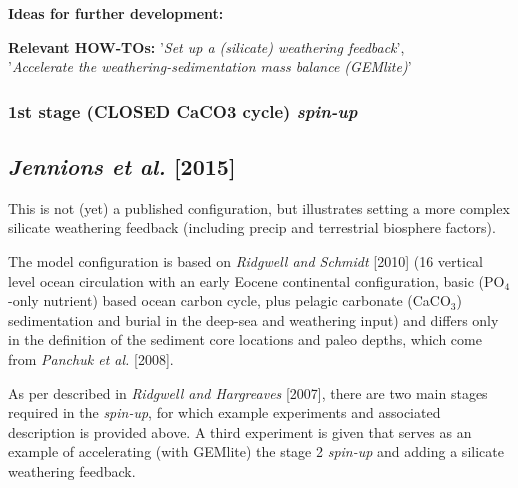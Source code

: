 \documentclass[10pt,twoside]{article}
\begin{document}
\noindent \textbf{Ideas for further development:} 

\noindent \textbf{Relevant HOW-TOs:} '\textit{Set up a (silicate) weathering feedback}',
\\'\textit{Accelerate the weathering-sedimentation mass balance (GEMlite)}'


\subsubsection{1st stage (CLOSED CaCO3 cycle) \textit{spin-up}}\label{EXAMPLE.p0055c.Jennionsetal2015.SPIN1}

\subsection{\textit{Jennions et al.} [2015]}

This is not (yet) a published configuration, but illustrates setting a more complex silicate weathering feedback (including precip and terrestrial biosphere factors). 

The model configuration is based on \textit{Ridgwell and Schmidt} [2010] (16 vertical level ocean circulation with an early Eocene continental configuration, basic (PO$_{4}$-only nutrient) based ocean carbon cycle, plus pelagic carbonate (CaCO$_{3}$) sedimentation and burial in the  deep-sea and weathering input) and differs only in the definition of the sediment core locations and paleo depths, which come from \textit{Panchuk et al.} [2008].

As per described in \textit{Ridgwell and Hargreaves} [2007], there are two main stages required in the \textit{spin-up}, for which example experiments and associated description is provided above. A third experiment is given that serves as an example of accelerating (with GEMlite) the stage 2 \textit{spin-up} and adding a silicate weathering feedback.
\end{document}

